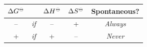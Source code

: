 \documentclass[
]{book}
\theoremstyle{definition}
\theoremstyle{definition}
\theoremstyle{definition}
\theoremstyle{remark}
\begin{document}
\begin{longtable}[]{@{}clccc@{}}
\toprule
\begin{minipage}[b]{0.15\columnwidth}\centering
\(\Delta G^{-\kern-6pt{\ominus}\kern-6pt-}\)\strut
\end{minipage} & \begin{minipage}[b]{0.03\columnwidth}\raggedright
\strut
\end{minipage} & \begin{minipage}[b]{0.15\columnwidth}\centering
\(\Delta H^{-\kern-6pt{\ominus}\kern-6pt-}\)\strut
\end{minipage} & \begin{minipage}[b]{0.15\columnwidth}\centering
\(\Delta S^{-\kern-6pt{\ominus}\kern-6pt-}\)\strut
\end{minipage} & \begin{minipage}[b]{0.38\columnwidth}\centering
Spontaneous?\strut
\end{minipage}\tabularnewline
\midrule
\endhead
\begin{minipage}[t]{0.15\columnwidth}\centering
--\strut
\end{minipage} & \begin{minipage}[t]{0.03\columnwidth}\raggedright
\emph{if}\strut
\end{minipage} & \begin{minipage}[t]{0.15\columnwidth}\centering
--\strut
\end{minipage} & \begin{minipage}[t]{0.15\columnwidth}\centering
+\strut
\end{minipage} & \begin{minipage}[t]{0.38\columnwidth}\centering
\emph{Always}\strut
\end{minipage}\tabularnewline
\begin{minipage}[t]{0.15\columnwidth}\centering
+\strut
\end{minipage} & \begin{minipage}[t]{0.03\columnwidth}\raggedright
\emph{if}\strut
\end{minipage} & \begin{minipage}[t]{0.15\columnwidth}\centering
+\strut
\end{minipage} & \begin{minipage}[t]{0.15\columnwidth}\centering
--\strut
\end{minipage} & \begin{minipage}[t]{0.38\columnwidth}\centering
\emph{Never}\strut
\end{minipage}\tabularnewline

\end{longtable}
\end{document}

